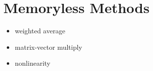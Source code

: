\section{Memoryless Methods}

\begin{itemize}
  \item weighted average
  \item matrix-vector multiply
  \item nonlinearity
\end{itemize}
